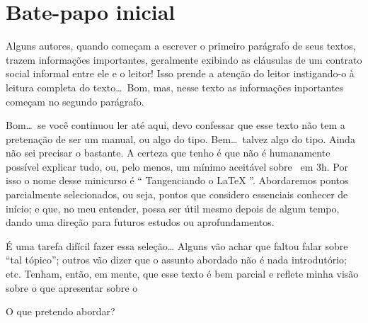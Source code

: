 
\chapter*{Bate-papo inicial} 
\label{cha:intro}

Alguns autores, quando começam a escrever o primeiro parágrafo de seus textos, 
trazem informações importantes, geralmente exibindo as cláusulas de um contrato
social informal entre ele e o leitor!
Isso prende a atenção do leitor instigando-o à leitura completa do texto\ldots\
Bom, mas, nesse texto as informações inportantes começam no segundo parágrafo. 
\emoji{smirking-face}

Bom\ldots\ se você continuou ler até aqui, devo confessar que esse texto não 
tem a pretenação de ser um manual, ou algo do tipo. 
Bem\ldots\ talvez algo do tipo. 
Ainda não sei precisar o bastante. 
A certeza que tenho é que não é humanamente possível explicar tudo, ou, pelo menos,
um mínimo aceitável sobre {\LaTeXX}\ em 3\unit{h}. 
Por isso o nome desse minicurso é `` {\fontins Tangenciando o \grega \LaTeX} ''. 
Abordaremos pontos parcialmente selecionados, ou seja, pontos que considero 
essenciais conhecer de início; e que, no meu entender, possa ser útil mesmo 
depois de algum tempo, dando uma direção para futuros estudos ou aprofundamentos. 

É uma tarefa difícil fazer essa seleção\ldots
Alguns vão achar que faltou falar sobre ``tal tópico''; outros vão dizer que 
o assunto abordado não é nada introdutório; etc. 
Tenham, então, em mente, que esse texto é bem parcial e reflete minha visão sobre 
o que  apresentar sobre o \LaTeXX\

O que pretendo abordar?

